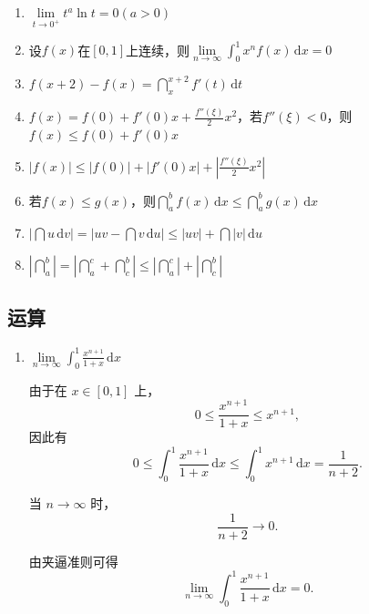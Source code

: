\documentclass[../book.tex]{subfiles}
\begin{document}
    \begin{enumerate}
        \item $\lim\limits_{t\to 0^+} t^a\ln t = 0(a > 0)$
        \item 设$f(x)$在$[0, 1]$上连续，则$\lim\limits_{n\to \infty} \displaystyle\int_0^1 x^{n}f(x)\,\mathrm{d}x = 0$
        \item $f(x + 2) - f(x) = \dint_x^{x + 2} f'(t)\,\mathrm{d}t$
        \item $f(x) = f(0) + f'(0)x + \displaystyle\frac{f''(\xi)}{2}x^2$，若$f''(\xi) < 0$，则$f(x) \leq f(0) + f'(0)x$
        \item $|f(x)| \leq |f(0)| + |f'(0)x| + \left|\displaystyle\frac{f''(\xi)}{2}x^2\right|$
        \item 若$f(x) \leq g(x)$，则$\dint_a^b f(x)\,\mathrm{d}x \leq \dint_a^b g(x)\,\mathrm{d}x$
        \item $\left|\dint u\,\mathrm{d}v\right| = \left|uv - \dint v\,\mathrm{d}u\right| \leq |uv| + \dint |v|\,\mathrm{d}u$
        \item $\left|\dint_a^b\right| = \left|\dint_a^c + \dint_c^b\right| \leq \left|\dint_a^c\right| + \left|\dint_c^b\right|$
    \end{enumerate}

    \subsection{运算}

    \begin{enumerate}
        \item $\lim\limits_{n\to\infty} \displaystyle\int_0^1 \frac{x^{n+1}}{1+x}\,\mathrm{d}x$
        \begin{analysisbox}
            由于在 $x\in[0,1]$ 上，
            \[
                0 \le \frac{x^{n+1}}{1+x} \le x^{n+1},
            \]
            因此有
            \[
                0 \le \int_0^1 \frac{x^{n+1}}{1+x}\,\mathrm{d}x
                \le \int_0^1 x^{n+1}\,\mathrm{d}x
                = \frac{1}{n+2}.
            \]

            当 $n\to\infty$ 时，
            \[
                \frac{1}{n+2} \to 0.
            \]

            由夹逼准则可得
            \[
                \lim_{n\to\infty}\int_0^1 \frac{x^{n+1}}{1+x}\,\mathrm{d}x
                = 0.
            \]
        \end{analysisbox}
    \end{enumerate}
\end{document}
